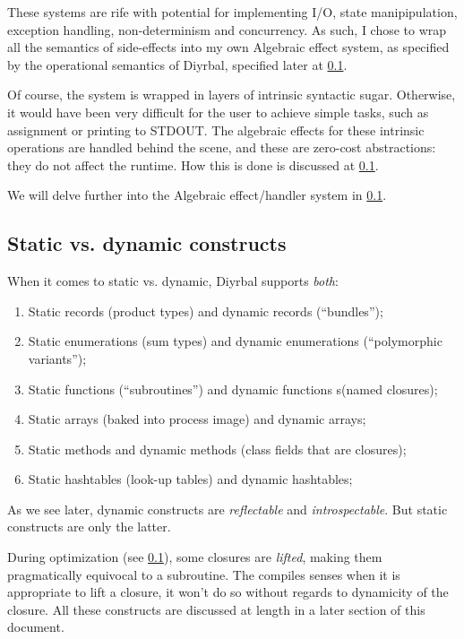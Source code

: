 \documentclass[a4paper,12pt]{article}
\newcommand{\nm}{Diyrbal\xspace}
\begin{document}
These systems are rife with potential for implementing I/O, state manipipulation, exception handling, non-determinism and concurrency. As such, I chose to wrap all the semantics of side-effects into my own Algebraic effect system, as specified by the operational semantics of \nm, specified later at \cref{}.

Of course, the system is wrapped in layers of intrinsic syntactic sugar. Otherwise, it would have been very difficult for the user to achieve simple tasks, such as assignment or printing to STDOUT. The algebraic effects for these intrinsic operations are handled behind the scene, and these are zero-cost abstractions: they do not affect the runtime. How this is done is discussed at \cref{}.

We will delve further into the Algebraic effect/handler system in \cref{}.

\subsection{Static vs. dynamic constructs}

When it comes to static vs. dynamic, \nm supports \textit{both}:

\begin{enumerate}
	\item Static records (product types) and dynamic records (``bundles'');
	\item Static enumerations (sum types) and dynamic enumerations (``polymorphic variants'');
	\item Static functions (``subroutines'') and dynamic functions s(named closures);
	\item Static arrays (baked into process image) and dynamic arrays;
	\item Static methods and dynamic methods (class fields that are closures);
	\item Static hashtables (look-up tables) and dynamic hashtables;
\end{enumerate}

As we see later, dynamic constructs are \textit{reflectable} and \textit{introspectable}. But static constructs are only the latter. 

During optimization (see \cref{}), some closures are \textit{lifted}, making them pragmatically equivocal to a subroutine. The compiles senses when it is appropriate to lift a closure, it won't do so without regards to dynamicity of the closure. All these constructs are discussed at length in a later section of this document.
\end{document}
